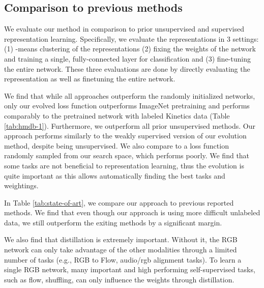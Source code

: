 \documentclass[10pt,twocolumn,letterpaper]{article}
\begin{document}
\subsection{Comparison to previous methods}

We evaluate our method in comparison to prior unsupervised and supervised representation learning. Specifically, we evaluate the representations in 3 settings: (1) -means clustering of the representations (2) fixing the weights of the network and training a single, fully-connected layer for classification and (3) fine-tuning the entire network. These three evaluations are done by directly evaluating the representation as well as finetuning the entire network.

We find that while all approaches outperform the randomly initialized networks, only our evolved loss function outperforms ImageNet pretraining and performs comparably to the pretrained network with labeled Kinetics data (Table \ref{tab:hmdb-1}). Furthermore, we outperform all prior unsupervised methods. Our approach performs similarly to the weakly supervised version of our evolution method, despite being unsupervised. 
We also compare to a loss function randomly sampled from our search space, which performs poorly. We find that some tasks are not beneficial to representation learning, thus the evolution is quite important as this allows automatically finding the best tasks and weightings.


In Table \ref{tab:state-of-art}, we compare our approach to previous reported methods. 
We find that even though our approach is using more difficult unlabeled data, we still outperform the exiting methods by a significant margin.

We also find that distillation is extremely important. Without it, the RGB network can only take advantage of the other modalities through a limited number of tasks (e.g., RGB to Flow, audio/rgb alignment tasks). To learn a single RGB network, many important and high performing self-supervised tasks, such as flow, shuffling, can only influence the weights through distillation.
\end{document}
